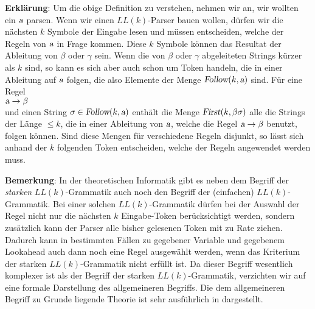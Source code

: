 \noindent
\textbf{Erkl\"arung}:  Um die obige Definition zu verstehen, nehmen wir an, wir wollten ein $\textsl{a}$ parsen.
Wenn wir einen $LL(k)$-Parser bauen wollen, d\"urfen wir die n\"achsten $k$ Symbole der Eingabe lesen
und m\"ussen entscheiden, welche der Regeln von $\textsl{a}$ in Frage kommen.  Diese $k$ Symbole k\"onnen das
Resultat der Ableitung von $\beta$ oder $\gamma$ sein.  Wenn die von $\beta$ oder $\gamma$
abgeleiteten Strings k\"urzer als $k$ sind, so kann es sich aber auch schon um Token
handeln, die in einer Ableitung auf $\textsl{a}$ folgen, die also Elemente der Menge
$\textsl{Follow}(k,\textsl{a})$ sind.  F\"ur eine Regel
\\[0.2cm]
\hspace*{1.3cm}
$\textsl{a} \rightarrow \beta$
\\[0.2cm]
und einen String $\sigma \in \textsl{Follow}(k,\textsl{a})$
enth\"alt die Menge $\textsl{First}(k, \beta \sigma)$ alle die Strings der L\"ange
$\leq k$, die in einer Ableitung von $\textsl{a}$, welche die Regel $\textsl{a} \rightarrow \beta$ benutzt,
folgen k\"onnen.  Sind diese Mengen f\"ur verschiedene Regeln disjunkt, so l\"asst sich anhand der
$k$ folgenden Token entscheiden, welche der Regeln angewendet werden muss.
\vspace*{0.2cm}

\noindent
\textbf{Bemerkung}:
In der theoretischen Informatik gibt es neben dem Begriff der \emph{starken} $LL(k)$-Grammatik auch
noch den Begriff der (einfachen) $LL(k)$-Grammatik.  Bei einer solchen $LL(k)$-Grammatik d\"urfen bei
der Auswahl der Regel nicht nur die n\"achsten $k$ Eingabe-Token ber\"ucksichtigt werden, sondern
zus\"atzlich kann der Parser alle bisher gelesenen Token mit zu Rate ziehen.  
Dadurch kann in bestimmten F\"allen zu gegebener Variable und gegebenem Lookahead auch dann
noch eine Regel ausgew\"ahlt werden, wenn das Kriterium der starken $LL(k)$-Grammatik nicht
erf\"ullt ist.
Da dieser Begriff
wesentlich komplexer ist als der Begriff der
starken $LL(k)$-Grammatik, verzichten wir auf eine formale Darstellung des
allgemeineren Begriffs.  
Die dem allgemeineren Begriff zu Grunde liegende Theorie ist sehr ausf\"uhrlich in
\cite{aho:72} dargestellt. 

